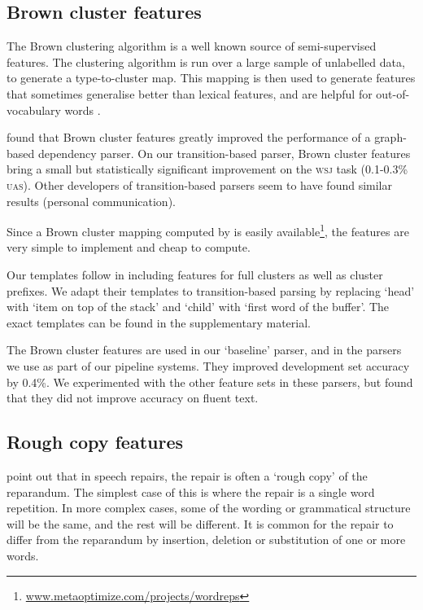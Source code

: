 \documentclass[11pt,letterpaper]{article}
\begin{document}
\subsection{Brown cluster features}

The Brown clustering algorithm \citep{brown:92} is a well known source
of semi-supervised features. The clustering algorithm is run over a large sample
of unlabelled data, to generate a type-to-cluster map. This mapping is then used
to generate features that sometimes generalise better than lexical features,
and are helpful for out-of-vocabulary words \citep{turian:10}.

\citet{koo:10} found that Brown cluster features greatly improved the performance
of a graph-based dependency parser. On our transition-based parser, Brown cluster
features bring a small but statistically significant improvement on the \textsc{wsj}
task (0.1-0.3\% \textsc{uas}).  Other developers of transition-based parsers
seem to have found similar results (personal communication).

Since a Brown cluster mapping computed by \citet{liang:05} is easily
available\footnote{\url{www.metaoptimize.com/projects/wordreps}}, the features
are very simple to implement and cheap to compute.

Our templates follow \citet{koo:10} in including features for full clusters as
well as cluster prefixes. We adapt their templates to transition-based parsing
by replacing `head' with `item on top of the stack' and `child' with `first word
of the buffer'. The exact templates can be found in the supplementary material.

The Brown cluster features are used in our `baseline' parser, and in the parsers
we use as part of our pipeline systems. They improved development set accuracy
by 0.4\%.  We experimented with the other feature sets in these parsers, but found
that they did not improve accuracy on fluent text.

\subsection{Rough copy features}

\citet{Johnson04a} point out that in speech repairs, the repair is often a `rough
copy' of the reparandum.  The simplest case of this is where the repair is a single
word repetition. In more complex cases, some of the wording or grammatical
structure will be the same, and the rest will be different.  
It is common for the repair to differ from the reparandum by insertion, deletion
or substitution of one or more words.
\end{document}
